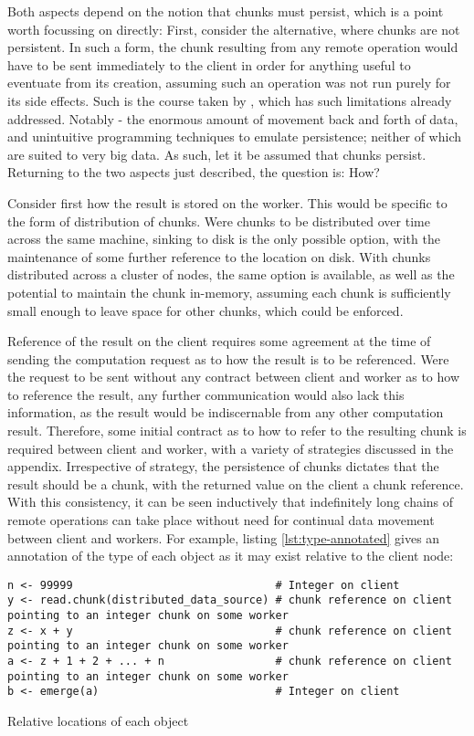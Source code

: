 Both aspects depend on the notion that chunks must persist, which is a
point worth focussing on directly: First, consider the alternative,
where chunks are not persistent. In such a form, the chunk resulting
from any remote operation would have to be sent immediately to the
client in order for anything useful to eventuate from its creation,
assuming such an operation was not run purely for its side effects. Such
is the course taken by , which has such limitations already
addressed. Notably - the enormous amount of movement back and forth of
data, and unintuitive programming techniques to emulate persistence;
neither of which are suited to very big data. As such, let it be assumed
that chunks persist. Returning to the two aspects just described, the
question is: How?

Consider first how the result is stored on the worker. This would be
specific to the form of distribution of chunks. Were chunks to be
distributed over time across the same machine, sinking to disk is the
only possible option, with the maintenance of some further reference to
the location on disk. With chunks distributed across a cluster of nodes,
the same option is available, as well as the potential to maintain the
chunk in-memory, assuming each chunk is sufficiently small enough to
leave space for other chunks, which could be enforced.

Reference of the result on the client requires some agreement at the
time of sending the computation request as to how the result is to be
referenced. Were the request to be sent without any contract between
client and worker as to how to reference the result, any further
communication would also lack this information, as the result would be
indiscernable from any other computation result. Therefore, some initial
contract as to how to refer to the resulting chunk is required between
client and worker, with a variety of strategies discussed in the
appendix. Irrespective of strategy, the persistence of chunks dictates
that the result should be a chunk, with the returned value on the client
a chunk reference. With this consistency, it can be seen inductively
that indefinitely long chains of remote operations can take place
without need for continual data movement between client and workers. For
example, listing \cref{lst:type-annotated} gives an annotation of the type of each
object as it may exist relative to the client node:

\begin{listing}
    \begin{verbatim}
n <- 99999                               # Integer on client
y <- read.chunk(distributed_data_source) # chunk reference on client pointing to an integer chunk on some worker
z <- x + y                               # chunk reference on client pointing to an integer chunk on some worker
a <- z + 1 + 2 + ... + n                 # chunk reference on client pointing to an integer chunk on some worker
b <- emerge(a)                           # Integer on client
    \end{verbatim}
    \caption{Relative locations of each object}
    \label{lst:type-annotated}
\end{listing}

